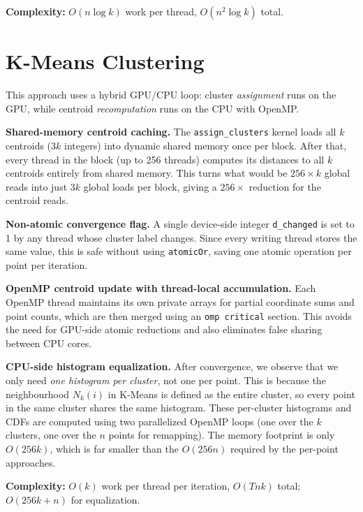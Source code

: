 \documentclass[11pt,a4paper]{article}
\begin{document}
\textbf{Complexity:} $O(n \log k)$ work per thread, $O(n^2 \log k)$ total.

\section{K-Means Clustering}

This approach uses a hybrid GPU/CPU loop: cluster \emph{assignment} runs on the GPU, while centroid \emph{recomputation} runs on the CPU with OpenMP.

\textbf{Shared-memory centroid caching.}
The \texttt{assign\_clusters} kernel loads all $k$ centroids ($3k$ integers) into dynamic shared memory once per block.
After that, every thread in the block (up to 256 threads) computes its distances to all $k$ centroids entirely from shared memory.
This turns what would be $256 \times k$ global reads into just $3k$ global loads per block, giving a $256\times$ reduction for the centroid reads.

\textbf{Non-atomic convergence flag.}
A single device-side integer \texttt{d\_changed} is set to 1 by any thread whose cluster label changes.
Since every writing thread stores the same value, this is safe without using \texttt{atomicOr}, saving one atomic operation per point per iteration.

\textbf{OpenMP centroid update with thread-local accumulation.}
Each OpenMP thread maintains its own private arrays for partial coordinate sums and point counts, which are then merged using an \texttt{omp critical} section.
This avoids the need for GPU-side atomic reductions and also eliminates false sharing between CPU cores.

\textbf{CPU-side histogram equalization.}
After convergence, we observe that we only need \emph{one histogram per cluster}, not one per point.
This is because the neighbourhood $N_k(i)$ in K-Means is defined as the entire cluster, so every point in the same cluster shares the same histogram.
These per-cluster histograms and CDFs are computed using two parallelized OpenMP loops (one over the $k$ clusters, one over the $n$ points for remapping).
The memory footprint is only $O(256k)$, which is far smaller than the $O(256n)$ required by the per-point approaches.

\textbf{Complexity:} $O(k)$ work per thread per iteration, $O(Tnk)$ total; $O(256k + n)$ for equalization.
\end{document}

